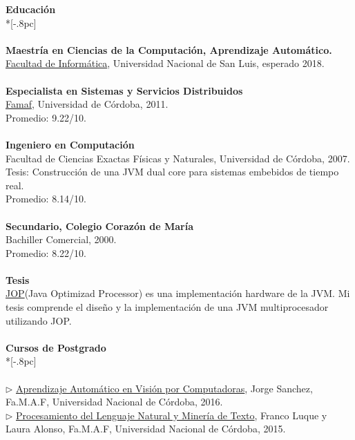 \documentclass[a4paper,11pt,english]{article}
\begin{document}
{\large \bf Educaci\'on} \\*[-.8pc]
\underline{\hspace{6in}} \\
\\
{\bf Maestr\'ia en Ciencias de la Computaci\'on, Aprendizaje Autom\'atico.}\\
\href{http://www.dirinfo.unsl.edu.ar/posgrado/}{Facultad de Inform\'atica}, Universidad Nacional de San Luis, esperado 2018. \\
\\
{\bf Especialista en Sistemas y Servicios Distribuidos}\\
\href{http://www.famaf.unc.edu.ar/}{Famaf}, Universidad de C\'ordoba, 2011. \\
Promedio: 9.22/10. \\
\\
{\bf Ingeniero en Computaci\'on}\\
Facultad de Ciencias Exactas F\'isicas y Naturales, Universidad de C\'ordoba, 2007.\\
Tesis: Construcci\'on de una JVM dual core para sistemas embebidos de tiempo real.\\
Promedio: 8.14/10. \\
\\
{\bf Secundario, Colegio Coraz\'on de Mar\'ia}\\
Bachiller Comercial, 2000.\\
Promedio: 8.22/10.\\
\\
{\bf Tesis} \\
\href{http://www.jopdesign.com}{JOP}(Java Optimizad Processor) es una implementaci\'on hardware de la JVM.
Mi tesis comprende el dise\~{n}o y la implementaci\'on de una JVM multiprocesador utilizando JOP.\\
\\
{\large \bf Cursos de Postgrado}\\ *[-.8pc]
\underline{\hspace{6in}}\\
\\
$\triangleright$ \href{http://www.famaf.unc.edu.ar/~jsanchez/aavc16/}{Aprendizaje Autom\'atico en Visi\'on por Computadoras}, Jorge Sanchez, Fa.M.A.F, Universidad Nacional de C\'ordoba, 2016.\\
$\triangleright$ \href{http://cs.famaf.unc.edu.ar/wiki/materias/pln}{Procesamiento del Lenguaje Natural y Miner\'ia de Texto}, Franco Luque y Laura Alonso, Fa.M.A.F, Universidad Nacional de C\'ordoba, 2015.\\
\end{document}
